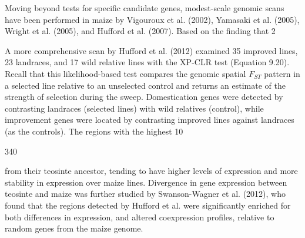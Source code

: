 \documentclass{article}
\begin{document}
Moving beyond tests for specific candidate genes, modest-scale genomic scans have been performed in maize by Vigouroux et al. (2002), Yamasaki et al. (2005), Wright et al. (2005), and Hufford et al. (2007). Based on the finding that 2%

A more comprehensive scan by Hufford et al. (2012) examined 35 improved lines, 23 landraces, and 17 wild relative lines with the XP-CLR test (Equation 9.20). Recall that this likelihood-based test compares the genomic spatial  $ F_{ST} $ pattern in a selected line relative to an unselected control and returns an estimate of the strength of selection during the sweep. Domestication genes were detected by contrasting landraces (selected lines) with wild relatives (control), while improvement genes were located by contrasting improved lines against landraces (as the controls). The regions with the highest 10%

340

from their teosinte ancestor, tending to have higher levels of expression and more stability in expression over maize lines. Divergence in gene expression between teosinte and maize was further studied by Swanson-Wagner et al. (2012), who found that the regions detected by Hufford et al. were significantly enriched for both differences in expression, and altered coexpression profiles, relative to random genes from the maize genome.
\end{document}
